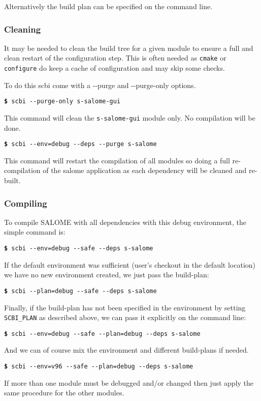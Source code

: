 \documentclass[a4paper,12pt,twoside]{article}
\newcommand{\code}[1]{\texttt{#1}}
\newcommand{\cmd}[1]{\tabto{1cm}\hspace{0.5cm}\texttt{\textbf{\$} #1}}
\newcommand{\ddash}{-{}-}
\begin{document}
Alternatively the build plan can be specified on the command line.

\subsubsection{Cleaning}

It may be needed to clean the build tree for a given module to ensure a full and clean restart of the configuration step. This is often needed as \code{cmake} or \code{configure} do keep a cache of configuration and may skip some checks.

To do this scbi come with a \ddash{}purge and \ddash{}purge-only options.

\cmd{scbi \ddash{}purge-only s-salome-gui}

This command will clean the \code{s-salome-gui} module only. No compilation will be done.

\cmd{scbi \ddash{}env=debug \ddash{}deps \ddash{}purge s-salome}

This command will restart the compilation of all modules so doing a full re-compilation of the salome application as each dependency will be cleaned and re-built.

\subsubsection{Compiling}

To compile SALOME with all dependencies with this debug environment, the simple command is:

\cmd{scbi \ddash{}env=debug \ddash{}safe \ddash{}deps s-salome}

If the default environment was sufficient (user's checkout in the default location) we have no new environment created, we just pass the build-plan:

\cmd{scbi \ddash{}plan=debug \ddash{}safe \ddash{}deps s-salome}

Finally, if the build-plan has not been specified in the environment by setting \code{SCBI\_PLAN} as described above, we can pass it explicitly on the command line:

\cmd{scbi \ddash{}env=debug \ddash{}safe \ddash{}plan=debug \ddash{}deps s-salome}

And we can of course mix the environment and different build-plans if needed.

\cmd{scbi \ddash{}env=v96 \ddash{}safe \ddash{}plan=debug \ddash{}deps s-salome}

If more than one module must be debugged and/or changed then just apply the same procedure for the other modules.
\end{document}
